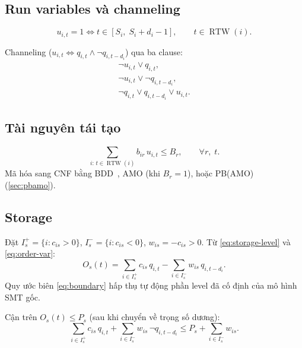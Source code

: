\documentclass[11pt,a4paper]{article}
\theoremstyle{remark}
\newcommand{\RTW}{\operatorname{RTW}}
\begin{document}
\subsection{Run variables và channeling}

\begin{equation}
  u_{i,t} = 1 \iff t \in [S_i,\; S_i + d_i - 1], \qquad t \in \RTW(i).
  \label{eq:run-var}
\end{equation}

Channeling ($u_{i,t} \iff q_{i,t} \land \neg q_{i,t-d_i}$) qua ba clause:
\begin{align}
  \neg u_{i,t} \lor q_{i,t}, \tag{17a}\label{eq:ch-a}\\
  \neg u_{i,t} \lor \neg q_{i,t-d_i}, \tag{17b}\label{eq:ch-b}\\
  \neg q_{i,t} \lor q_{i,t-d_i} \lor u_{i,t}. \tag{17c}\label{eq:ch-c}
\end{align}

\subsection{Tài nguyên tái tạo}

\begin{equation}
  \sum_{i:\,t \in \RTW(i)} b_{ir}\, u_{i,t} \le B_r,
  \qquad \forall r,\; t.
  \label{eq:renewable-pb}
\end{equation}
Mã hóa sang CNF bằng BDD~\cite{abio2012bdd}, AMO (khi $B_r=1$),
hoặc PB(AMO) (\cref{sec:pbamo}).

\subsection{Storage}

Đặt $I_s^+ = \{i : c_{is} > 0\}$, $I_s^- = \{i : c_{is} < 0\}$,
$w_{is} = -c_{is} > 0$.
Từ \eqref{eq:storage-level} và \eqref{eq:order-var}:
\begin{equation}
  O_s(t) = \sum_{i \in I_s^+} c_{is}\, q_{i,t}
          - \sum_{i \in I_s^-} w_{is}\, q_{i,t-d_i}.
  \label{eq:storage-q}
\end{equation}
Quy ước biên \eqref{eq:boundary} hấp thụ tự động phần level đã cố định
của mô hình SMT gốc.

Cận trên $O_s(t) \le P_s$ (sau khi chuyển về trọng số dương):
\begin{equation}
  \sum_{i \in I_s^+} c_{is}\, q_{i,t}
  + \sum_{i \in I_s^-} w_{is}\, \neg q_{i,t-d_i}
  \le P_s + \textstyle\sum_{i \in I_s^-} w_{is}.
  \label{eq:storage-ub}
\end{equation}
\end{document}
